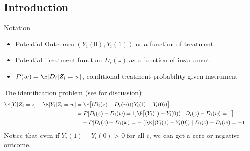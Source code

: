 \documentclass[12pt]{article}
\theoremstyle{plain}
\theoremstyle{definition}
\theoremstyle{remark}
\begin{document}
\subsection{Introduction}

Notation
\begin{itemize}
  \item Potential Outcomes $(Y_i(0), Y_i(1))$ as a function of treatment
  \item Potential Treatment function $D_i(z)$ as a function of
    instrument
  \item $P(w) = \E[D_i|Z_i=w]$, conditional treatment probability given
    instrument
\end{itemize}
The identification problem (see \cite{imbensangrist1994LATE} for discussion):
\begin{align*}
  \E[Y_i|Z_i=z]
  -
  \E[Y_i|Z_i=w]
  &=
  \E\big[
    (D_i(z)-D_i(w))
    (Y_i(1)-Y_i(0))
  \big]
  \\
  &=
  P[D_i(z)-D_i(w)=1]
  \E\big[
    (Y_i(1)-Y_i(0))
    \;|\;
    D_i(z)-D_i(w)=1
  \big]
  \\
  &\quad
  -
  P[D_i(z)-D_i(w)=-1]
  \E\big[
    (Y_i(1)-Y_i(0))
    \;|\;
    D_i(z)-D_i(w)=-1
  \big]
\end{align*}
Notice that even if $Y_i(1)-Y_i(0)>0$ for all $i$, we can get a zero or
negative outcome.
\end{document}
